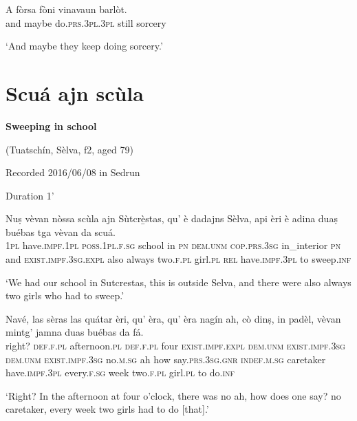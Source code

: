 \begin{linenumbers} 
\gll    A fòrsa fòni vinavaun barlòt. \\
and maybe do.\textsc{prs.3pl.3pl} still sorcery\\
\end{linenumbers}
\medskip
\glt `And maybe they keep doing sorcery.'
\medskip

\section{Scuá ajn scùla}

\noindent
\textbf{Sweeping in school}

\noindent
(Tuatschín, Sèlva, f2, aged 79)

\noindent
Recorded 2016/06/08 in Sedrun

\noindent
Duration 1'

\bigskip

\begin{linenumbers}
\gll Nuṣ vèvan nòssa scùla ajn Sùtcrè̱stas, qu’ è dadajns Sèlva, api èri è adina duaṣ buébas tga vèvan da scuá. \\
  \textsc{1pl} have.\textsc{impf.1pl} \textsc{poss.1pl.f.sg} school in \textsc{pn} \textsc{dem.unm} \textsc{cop.prs.3sg} in\_interior \textsc{pn} and \textsc{exist.impf.3sg.expl} also always two.\textsc{f.pl} girl.\textsc{pl} \textsc{rel} have.\textsc{impf.3pl} to sweep.\textsc{inf}\\
 \end{linenumbers}
 \medskip
\glt `We had our school in Sutcrestas, this is outside Selva, and there were also always two girls who had to sweep.'
\medskip

\begin{linenumbers}
\gll   Navé, las sèras las quátar èri, qu' èra, qu’ èra nagín ah, cò dinṣ, in padèl, vèvan mintg’ jamna duas buébas da fá.\\
 right? \textsc{def.f.pl} afternoon.\textsc{pl} \textsc{def.f.pl} four \textsc{exist.impf.expl} \textsc{dem.unm} \textsc{exist.impf.3sg} \textsc{dem.unm} \textsc{exist.impf.3sg} no.\textsc{m.sg} ah how say.\textsc{prs.3sg.gnr} \textsc{indef.m.sg} caretaker have.\textsc{impf.3pl} every.\textsc{f.sg} week two.\textsc{f.pl} girl.\textsc{pl} to do.\textsc{inf}\\
\end{linenumbers}
\medskip
\glt `Right? In the afternoon at four o’clock, there was no ah, how does one say? no caretaker, every week two girls had to do [that].'
\medskip

